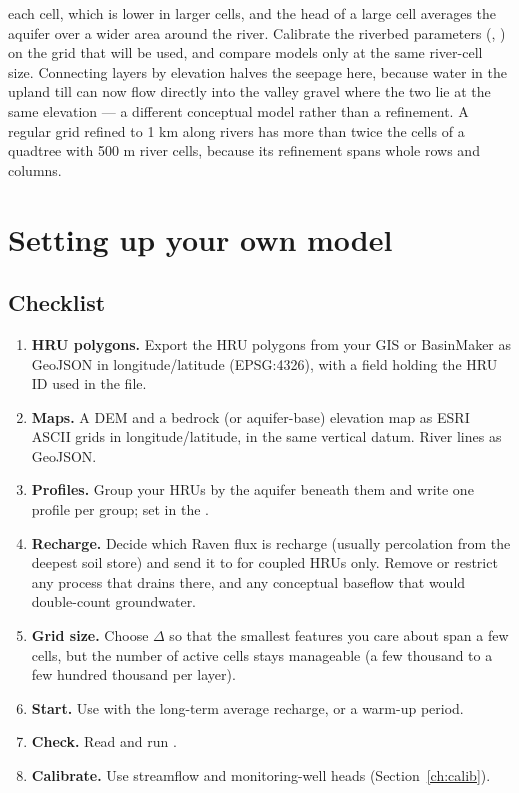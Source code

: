 each cell, which is lower in larger cells, and the head of a large cell averages the aquifer over a wider area around the
river. Calibrate the riverbed parameters (, ) on the grid that will be used, and
compare models only at the same river-cell size. Connecting layers by elevation halves the seepage here, because water in
the upland till can now flow directly into the valley gravel where the two lie at the same elevation --- a different
conceptual model rather than a refinement. A regular grid refined to 1 km along rivers has more than twice the cells of a
quadtree with 500 m river cells, because its refinement spans whole rows and columns.

\section{Setting up your own model}\label{ch:ownmodel}
\subsection{Checklist}
\begin{enumerate}
\item \textbf{HRU polygons.} Export the HRU polygons from your GIS or BasinMaker as GeoJSON in longitude/latitude
(EPSG:4326), with a field holding the HRU ID used in the  file.
\item \textbf{Maps.} A DEM and a bedrock (or aquifer-base) elevation map as ESRI ASCII grids in longitude/latitude, in the same
vertical datum. River lines as GeoJSON.
\item \textbf{Profiles.} Group your HRUs by the aquifer beneath them and write one profile per group; set
 in the .
\item \textbf{Recharge.} Decide which Raven flux is recharge (usually percolation from the deepest soil store) and send it
to  for coupled HRUs only. Remove or restrict any process that drains  there, and any
conceptual baseflow that would double-count groundwater.
\item \textbf{Grid size.} Choose $\Delta$ so that the smallest features you care about span a few cells, but the number of
active cells stays manageable (a few thousand to a few hundred thousand per layer).
\item \textbf{Start.} Use  with the long-term average recharge, or a warm-up period.
\item \textbf{Check.} Read  and run .
\item \textbf{Calibrate.} Use streamflow and monitoring-well heads (Section~\ref{ch:calib}).
\end{enumerate}


